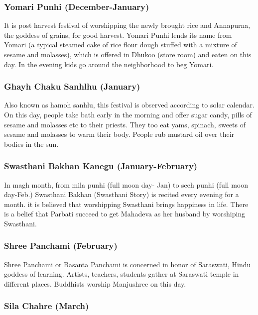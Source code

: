 \documentclass[a4paper,13pt, margin=0.9in]{article}
\begin{document}
\begin{flushleft}
	\subsubsection{Yomari Punhi (December-January)}

	It is post harvest festival of worshipping the newly brought rice and Annapurna, the goddess of grains, for good harvest. Yomari Punhi lends its name from Yomari (a typical steamed cake of rice flour dough stuffed with a mixture of sesame and molasses), which is offered in Dhukoo (store room) and eaten on this day. In the evening kids go around the neighborhood to beg Yomari.

	\subsubsection{Ghayh Chaku Sanhlhu (January)}

	Also known as hamoh sanhlu, this festival is observed according to solar calendar. On this day, people take bath early in the morning and offer sugar candy, pills of sesame and molasses etc to their priests. They too eat yams, spinach, sweets of sesame and molasses to warm their body. People rub mustard oil over their bodies in the sun.

	\subsubsection{Swasthani Bakhan Kanegu (January-February)}

	In magh month, from mila punhi (full moon day- Jan) to seeh punhi (full moon day-Feb.) Swasthani Bakhan (Swasthani Story) is recited every evening for a month. it is believed that worshipping Swasthani brings happiness in life. There is a belief that Parbati succeed to get Mahadeva as her husband by worshiping Swasthani.

	\subsubsection{Shree Panchami (February)}

	Shree Panchami or Basanta Panchami is concerned in honor of Saraswati, Hindu goddess of learning. Artists, teachers, students gather at Saraswati temple in different places. Buddhists worship Manjushree on this day.

	\subsubsection{Sila Chahre (March)}


\end{flushleft}
\end{document}

